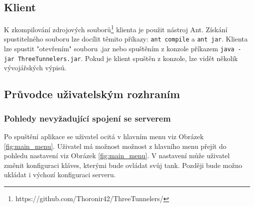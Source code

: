 \documentclass[12pt,a4paper]{article}
\begin{document}
\subsection{Klient}
K zkompilování zdrojových souborů\footnote{https://github.com/Thoronir42/ThreeTunnelers/} klienta je použit nástroj Ant. Získání spustitelného souboru lze docílit těmito příkazy: \texttt{ant compile} a \texttt{ant jar}.
Klienta lze spustit "otevřením" souboru .jar nebo spuštěním z konzole příkazem \texttt{java -jar ThreeTunnelers.jar}. Pokud je klient spuštěn z konzole, lze vidět několik vývojářských výpisů.
\newpage
\subsection{Průvodce uživatelským rozhraním}
\subsubsection*{Pohledy nevyžadující spojení se serverem}
Po spuštění aplikace se uživatel ocitá v hlavním menu viz Obrázek \ref{fig:main_menu}. Uživatel má možnost možnost z hlavního menu přejít do pohledu nastavení viz Obrázek \ref{fig:main_menu}. V nastavení může uživatel změnit konfiguraci kláves, kterými bude ovládat svůj tank. Později bude možno ukládat i výchozí konfiguraci serveru. \\
\end{document}
